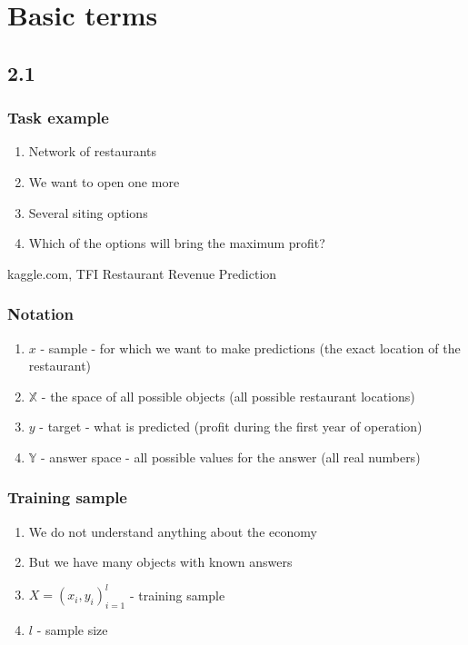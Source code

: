 \documentclass[default]{beamer}
\begin{document}
	\section{Basic terms}
	\subsection{2.1}
	\begin{frame}
		\frametitle{Task example}
		\Large		
		\begin{enumerate}
			\item Network of restaurants
			\item We want to open one more
			\item Several siting options
			\item Which of the options will bring the maximum profit?
		\end{enumerate}

		\vspace*{30pt}
		\small
		kaggle.com, TFI Restaurant Revenue Prediction
	\end{frame}

	\begin{frame}
		\frametitle{Notation}
		\Large		
		\begin{enumerate}
			\item $x$ - sample - for which we want to make predictions (the exact location of the restaurant)
			\item $\mathbb X$ - the space of all possible objects (all possible restaurant locations)
			\item $y$ - target - what is predicted (profit during the first year of operation)
			\item $\mathbb Y$ - answer space - all possible values for the answer (all real numbers)
		\end{enumerate}
	\end{frame}

	\begin{frame}
		\frametitle{Training sample}
		\Large		
		\begin{enumerate}
			\item We do not understand anything about the economy
			\item But we have many objects with known answers
			\item $X =(x_i,y_i)^l_{i=1}$ - training sample
			\item $l$ - sample size
		\end{enumerate}
	\end{frame}
\end{document}
